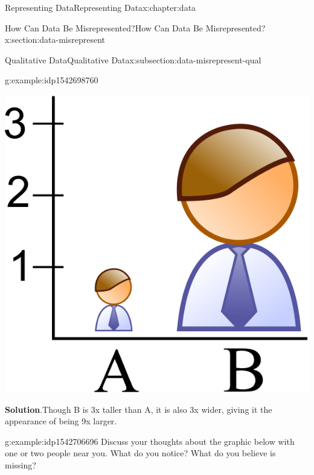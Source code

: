 \documentclass[oneside,10pt,]{book}
\newcommand{\blocktitlefont}{\relax}
\begin{document}
\begin{chapterptx}{Representing Data}{}{Representing Data}{}{}{x:chapter:data}
\begin{sectionptx}{How Can Data Be Misrepresented?}{}{How Can Data Be Misrepresented?}{}{}{x:section:data-misrepresent}
\begin{subsectionptx}{Qualitative Data}{}{Qualitative Data}{}{}{x:subsection:data-misrepresent-qual}
\begin{example}{}{g:example:idp1542698760}
\begin{image}{0.25}{0.5}{0.25}
\includegraphics[width=\linewidth]{external/pictograph_scaled.svg}
\end{image}%
%
\par\smallskip%
\noindent\textbf{\blocktitlefont Solution}.\hypertarget{g:solution:idp1542710280}{}\quad{}Though B is 3x taller than A, it is also 3x wider, giving it the appearance of being 9x larger.%
\end{example}
\begin{example}{}{g:example:idp1542706696}%
Discuss your thoughts about the graphic below with one or two people near you.  What do you notice?  What do you believe is missing?%
\par
\begin{image}{0.25}{0.5}{0.25}%

\end{image}
\end{example}
\end{subsectionptx}
\end{sectionptx}
\end{chapterptx}
\end{document}
